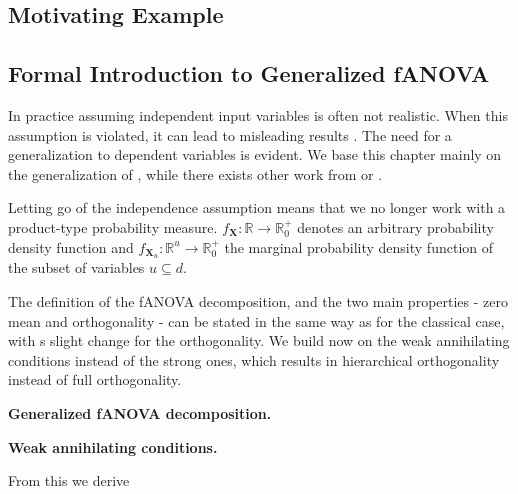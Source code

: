 \subsection{Motivating Example}

\subsection{Formal Introduction to Generalized fANOVA}
In practice assuming independent input variables is often not realistic. When this assumption is violated, it can lead to misleading results \citep{hooker2007}. The need for a generalization to dependent variables is evident. We base this chapter mainly on the generalization of \cite{rahman2014}, while there exists other work from \cite{hooker2007} or \cite{chastaing2012}.\par

Letting go of the independence assumption means that we no longer work with a product-type probability measure. $f_{\boldsymbol{X}}: \mathbb{R} \rightarrow \mathbb{R}_{0}^{+}$ denotes an arbitrary probability density function and $f_{\boldsymbol{X}_u}: \mathbb{R}^u \rightarrow \mathbb{R}_{0}^{+}$ the marginal probability density function of the subset of variables $u \subseteq d$.\par

The definition of the fANOVA decomposition, and the two main properties - zero mean and orthogonality - can be stated in the same way as for the classical case, with s slight change for the orthogonality. We build now on the weak annihilating conditions instead of the strong ones, which results in hierarchical orthogonality instead of full orthogonality.\par

\begin{definition}
    \textbf{Generalized fANOVA decomposition.}
\end{definition}

\textbf{Weak annihilating conditions.}

From this we derive

\begin{proposition}
\end{proposition}

\begin{proposition}
\end{proposition}


